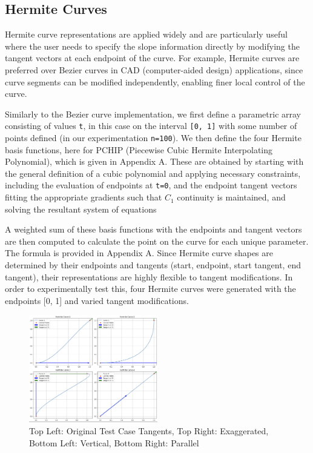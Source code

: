 \documentclass[10pt,a4paper]{article}
\begin{document}
\subsection{Hermite Curves}

Hermite curve representations are applied widely and are particularly useful where the user needs to specify the slope information directly by modifying the tangent vectors at each endpoint of the curve. For example, Hermite curves are preferred over Bezier curves in CAD (computer-aided design) applications, since curve segments can be modified independently, enabling finer local control of the curve.  

Similarly to the Bezier curve implementation, we first define a parametric array consisting of values \texttt{t}, in this case on the interval \texttt{[0, 1]} with some number of points defined (in our experimentation \texttt{n=100}). We then define the four Hermite basis functions, here for PCHIP (Piecewise Cubic Hermite Interpolating Polynomial), which is given in Appendix A. These are obtained by starting with the general definition of a cubic polynomial and applying necessary constraints, including the evaluation of endpoints at \texttt{t=0}, and the endpoint tangent vectors fitting the appropriate gradients such that $C_{1}$ continuity is maintained, and solving the resultant system of equations

A weighted sum of these basis functions with the endpoints and tangent vectors are then computed to calculate the point on the curve for each unique parameter. The formula is provided in Appendix A. Since Hermite curve shapes are determined by their endpoints and tangents (start, endpoint, start tangent, end tangent), their representations are highly flexible to tangent modifications. In order to experimentally test this, four Hermite curves were generated with the endpoints [0, 1] and varied tangent modifications.

\begin{figure}[H]
\centering
\includegraphics[width=0.5\textwidth]{VisualComputingReportResults/HermiteCurves}
\caption{Top Left: Original Test Case Tangents, Top Right: Exaggerated, Bottom Left: Vertical, Bottom Right: Parallel}
\label{fig:your_label}
\end{figure}
\end{document}

